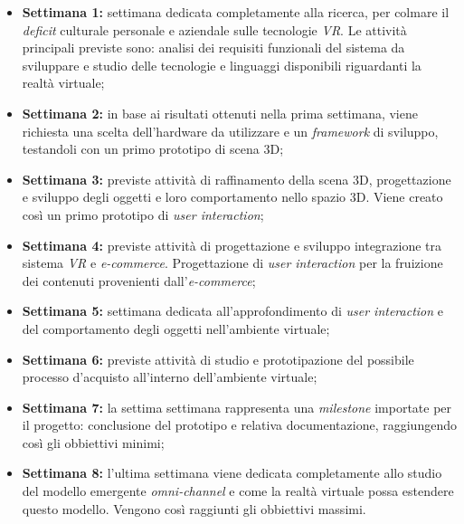 \begin{itemize}
	\item \textbf{Settimana 1:} settimana dedicata completamente alla ricerca, per colmare il \textit{deficit} culturale personale e aziendale sulle tecnologie \textit{VR}. Le attività principali previste sono: analisi dei requisiti funzionali del sistema da sviluppare e studio delle tecnologie e linguaggi disponibili riguardanti la realtà virtuale;
	
	\item \textbf{Settimana 2:} in base ai risultati ottenuti nella prima settimana, viene richiesta una scelta dell'hardware da utilizzare e un \textit{framework} di sviluppo, testandoli con un primo prototipo di scena 3D;
	
	\item \textbf{Settimana 3:} previste attività di raffinamento della scena 3D, progettazione e sviluppo degli oggetti e loro comportamento nello spazio 3D. Viene creato così un primo prototipo di \textit{user interaction};
	
	\item \textbf{Settimana 4:} previste attività di progettazione e sviluppo integrazione tra sistema \textit{VR} e \textit{e-commerce}. Progettazione di \textit{user interaction} per la fruizione dei contenuti provenienti dall'\textit{e-commerce};
	
	\item \textbf{Settimana 5:} settimana dedicata all'approfondimento di \textit{user interaction} e del comportamento degli oggetti nell'ambiente virtuale;
	
	\item \textbf{Settimana 6:} previste attività di studio e prototipazione del possibile processo d'acquisto all'interno dell'ambiente virtuale;
	
	\item \textbf{Settimana 7:} la settima settimana rappresenta una \textit{milestone} importate per il progetto: conclusione del prototipo e relativa documentazione, raggiungendo così gli obbiettivi minimi;
	
	\item \textbf{Settimana 8:} l'ultima settimana viene dedicata completamente allo studio del modello emergente \textit{omni-channel} e come la realtà virtuale possa estendere questo modello. Vengono così raggiunti gli obbiettivi massimi.
\end{itemize}


